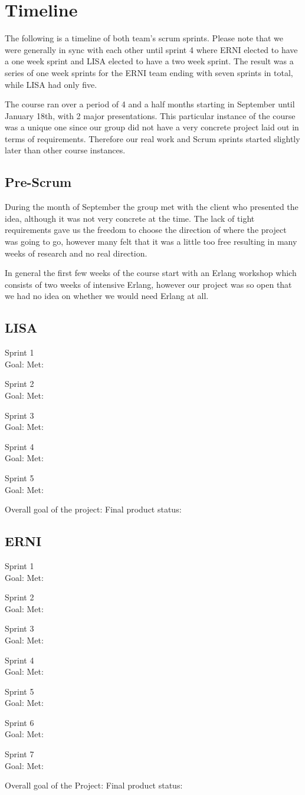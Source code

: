 \section {Timeline}

The following is a timeline of both team's scrum sprints. Please note that we were generally in sync with each other until sprint 4 where ERNI elected to have a one week sprint and LISA elected to have a two week sprint. The result was a series of one week sprints for the ERNI team ending with seven sprints in total, while LISA had only five.

The course ran over a period of 4 and a half months starting in September until January 18th, with 2 major presentations. This particular instance of the course was a unique one since our group did not have a very concrete project laid out in terms of requirements. Therefore our real work and Scrum sprints started slightly later than other course instances. 

\subsection{Pre-Scrum}
During the month of September the group met with the client who presented the idea, although it was not very concrete at the time. The lack of tight requirements gave us the freedom to choose the direction of where the project was going to go, however many felt that it was a little too free resulting in many weeks of research and no real direction. 

In general the first few weeks of the course start with an Erlang workshop which consists of two weeks of intensive Erlang, however our project was so open that we had no idea on whether we would need Erlang at all.

\subsection {LISA}

Sprint 1\\
Goal: 
Met:

Sprint 2\\
Goal: 
Met:

Sprint 3\\
Goal: 
Met:

Sprint 4\\
Goal: 
Met:

Sprint 5\\
Goal: 
Met:

Overall goal of the project:
Final product status:

\subsection {ERNI}

Sprint 1\\
Goal: 
Met:

Sprint 2\\
Goal: 
Met:

Sprint 3\\
Goal: 
Met:

Sprint 4\\
Goal: 
Met:

Sprint 5\\
Goal: 
Met:

Sprint 6\\
Goal: 
Met:

Sprint 7\\
Goal: 
Met:

Overall goal of the Project:
Final product status: